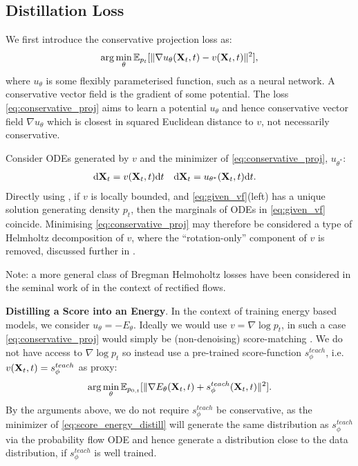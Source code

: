 \subsection{Distillation Loss}
We first introduce the conservative projection loss as: 
\begin{align} \label{eq:conservative_proj}
    \arg\min_{\theta} \mathbb{E}_{p_{t}}[\|\nabla u_\theta(\mathbf{X}_{t},t) - v(\mathbf{X}_{t},t)\|^2],
\end{align}
where $u_\theta$ is some flexibly parameterised function, such as a neural network. A conservative vector field is the gradient of some potential. The loss \eqref{eq:conservative_proj} aims to learn a potential $u_\theta$ and hence conservative vector field $\nabla u_\theta$ which is closest in squared Euclidean distance to $v$, not necessarily conservative.

Consider ODEs generated by $v$ and the minimizer of \eqref{eq:conservative_proj}, $u_{\theta^*}$:
\begin{align}
    \mathrm{d}\mathbf{X}_t &= v(\mathbf{X}_t,t)\mathrm{d}t & 
    \mathrm{d}\mathbf{X}_t &= u_{\theta^*}(\mathbf{X}_t,t)\mathrm{d}t. \label{eq:given_vf}
\end{align}
Directly using \cite[Theorem 5.2]{liu2022rectified}, if $v$ is locally bounded, and \eqref{eq:given_vf}(left) has a unique solution generating density $p_t$, then the marginals of ODEs in \eqref{eq:given_vf} coincide. Minimising \eqref{eq:conservative_proj} may therefore be considered a type of Helmholtz decomposition of $v$, where the ``rotation-only'' component of $v$ is removed, discussed further in .

Note: a more general class of Bregman Helmoholtz losses have been considered in the seminal work of \citet{liu2022rectified} in the context of rectified flows.

\textbf{Distilling a Score into an Energy}.
In the context of training energy based models, we consider $u_\theta = -E_\theta$. Ideally we would use $v=\nabla \log p_t$, in such a case \eqref{eq:conservative_proj} would simply be (non-denoising) score-matching \citep{hyvarinen05a}. We do not have access to $\nabla \log p_t$ so instead use a pre-trained score-function $s^{teach}_{\phi}$, i.e. $v(\mathbf{X}_{t},t)=s^{teach}_{\phi}$ as proxy:
\begin{align} \label{eq:score_energy_distill}
    \arg\min_{\theta} \mathbb{E}_{p_{0,t}}[\|\nabla E_\theta(\mathbf{X}_{t},t) + s^{teach}_\phi(\mathbf{X}_{t},t)\|^2].
\end{align}
By the arguments above, we do not require $s^{teach}_{\phi}$ be conservative, as the minimizer of \eqref{eq:score_energy_distill} will generate the same distribution as $s^{teach}_{\phi}$ via the probability flow ODE and hence generate a distribution close to the data distribution, if $s^{teach}_{\phi}$ is well trained.

